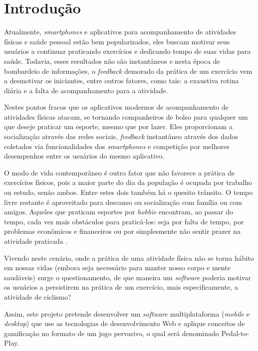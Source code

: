 \chapter{Introdução} \label{cap:introducao}
Atualmente, \textit{smartphones} e aplicativos para acompanhamento de atividades físicas e saúde pessoal estão bem popularizados, eles buscam motivar seus usuários a continuar praticando exercícios e dedicando tempo de suas vidas para saúde. Todavia, esses resultados não são instantâneos e nesta época de bombardeio de informações, o \textit{feedback} demorado da prática de um exercício vem a desmotivar os iniciantes, entre outros fatores, como tais: a exaustiva rotina diária e a falta de acompanhamento para a atividade. \par 

Nestes pontos fracos que os aplicativos modernos de acompanhamento de atividades físicas atacam, se tornando companheiros de bolso para qualquer um que deseje praticar um esporte, mesmo que por lazer. Eles proporcionam a socialização através das redes sociais, \textit{feedback} instantâneo através dos dados coletados via funcionalidades dos \textit{smartphones} e competição por melhores desempenhos entre os usuários do mesmo aplicativo. \par

O modo de vida contemporâneo é outro fator que não favorece a prática de exercícios físicos, pois a maior parte do dia da população é ocupada por trabalho ou estudo, senão ambos. Entre estes dois também há o quesito trânsito. O tempo livre restante é aproveitado para descanso ou socialização com família ou com amigos. Aqueles que praticam esportes por \textit{hobbie} encontram, ao passar do tempo, cada vez mais obstáculos para praticá-los: seja por falta de tempo, por problemas econômicos e financeiros ou por simplesmente não sentir prazer na atividade praticada \cite{butcher2002, liz2013}. \par

Vivendo neste cenário, onde a prática de uma atividade física não se torna hábito em nossas vidas (embora seja necessário para manter nosso corpo e mente saudáveis) surge o questionamento, de que maneira um \textit{software} poderia motivar os usuários a persistirem na prática de um exercício, mais especificamente, a atividade de ciclismo? \par

Assim, este projeto pretende desenvolver um \textit{software} multiplataforma (\textit{mobile} e \textit{desktop}) que use as tecnologias de desenvolvimento Web e aplique conceitos de gamificação no formato de um jogo pervasivo, o qual será denominado Pedal-to-Play. \par


